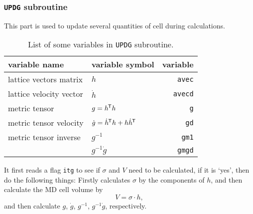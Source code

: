 
\subsubsection{\texttt{UPDG} subroutine}

This part is used to update several quantities of cell during calculations.

\begin{table}[htbp]
	\centering
	\caption{List of some variables in \texttt{UPDG} subroutine.}
	\begin{tabular}{@{}llr@{}}
		\toprule
		variable name           & variable symbol                                 & variable       \\
		\midrule
		lattice vectors matrix  & $h$                                             & \texttt{avec}  \\
		lattice velocity vector & $\dot{h}$                                       & \texttt{avecd} \\
		metric tensor           & $g = h ^{\mkern-1.5mu\mathsf{T}} h$                                 & \texttt{g}     \\
		metric tensor velocity  & $\dot{g} = \dot{ h }^{\mkern-1.5mu\mathsf{T}} h + h \dot{ h }^{\mkern-1.5mu\mathsf{T}}$ & \texttt{gd}    \\
		metric tensor inverse   & $g^{-1}$                                        & \texttt{gm1}   \\
		                        & $g^{-1} \dot{g}$                                & \texttt{gmgd}  \\
		\bottomrule
	\end{tabular}%
	\label{tab:updg}%
\end{table}%


It first reads a flag \texttt{itg} to see if $\sigma$ and $V$ need to be calculated,
if it is `yes', then do the following things:
Firstly calculates $\sigma$ by the components of $h$, and then calculate the
MD cell volume by
\begin{equation}
	V = \sigma \cdot h,
\end{equation}
and then calculate $g$, $\dot{ g }$, $g^{-1}$, $g^{-1}\dot{g}$, respectively.

